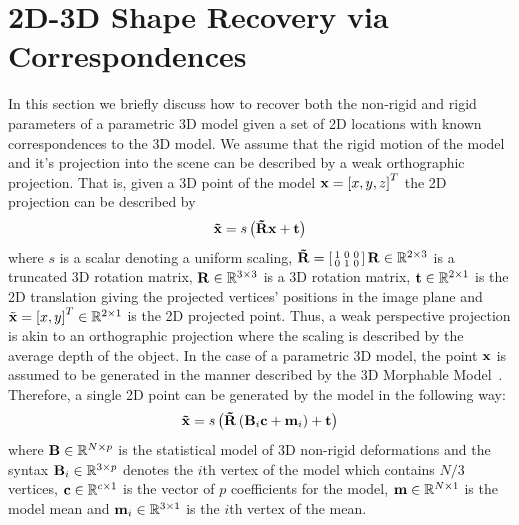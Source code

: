 \section{2D-3D Shape Recovery via Correspondences}\label{sec:face_flow_3d_recovery}
In this section we briefly discuss how to recover both the non-rigid and rigid
parameters of a parametric 3D model given a set of 2D locations with known
correspondences to the 3D model. We assume that the rigid motion of the model
and it's projection into the scene can be described by a weak orthographic
projection. That is, given a 3D point of the model $\boldsymbol{\mathbf{x}} = {[x, y, z]}^T$ the
2D projection can be described by
\begin{equation}
\boldsymbol{\mathbf{\tilde{x}}} = s \left( \boldsymbol{\mathbf{\tilde{R}}} \boldsymbol{\mathbf{x}} + \boldsymbol{\mathbf{t}} \right)
\end{equation}
where $s$ is a scalar denoting a uniform scaling,
$\boldsymbol{\mathbf{\tilde{R}}} = \left[\begin{smallmatrix} 1&0&0\\0&1&0 \end{smallmatrix}\right] \boldsymbol{\mathbf{R}} \in \mathbb{R}^{2 \times 3}$
is a truncated 3D rotation matrix, $\boldsymbol{\mathbf{R}} \in \mathbb{R}^{3 \times 3}$ is a 3D rotation matrix,
$\boldsymbol{\mathbf{t}} \in \mathbb{R}^{2 \times 1}$ is the 2D translation giving the projected vertices'
positions in the image plane and
$\tilde{\boldsymbol{\mathbf{x}}} = {[x, y]}^T \in \mathbb{R}^{2 \times 1}$ is the 2D projected point. 
Thus, a weak perspective projection is akin to an orthographic projection where the scaling
is described by the average depth of the object. In the case of a parametric 3D
model, the point $\boldsymbol{\mathbf{x}}$ is assumed to be generated in the manner described
by the 3D Morphable Model~\cite{volker1999morphable}. Therefore, a single 2D
point can be generated by the model in the following way:
\begin{equation}
\boldsymbol{\mathbf{\tilde{x}}} = s \left( \boldsymbol{\mathbf{\tilde{R}}} \left(\boldsymbol{\mathbf{B}}_i \boldsymbol{\mathbf{c}} + \boldsymbol{\mathbf{m}}_i\right) + \boldsymbol{\mathbf{t}} \right)
\end{equation}
where $\boldsymbol{\mathbf{B}} \in \mathbb{R}^{N \times p}$ is the statistical model of 3D non-rigid deformations
and the syntax $\boldsymbol{\mathbf{B}}_i \in \mathbb{R}^{3 \times p}$ denotes the $i$th vertex of the model which
contains $N / 3$ vertices,
$\boldsymbol{\mathbf{c}} \in \mathbb{R}^{c \times 1}$ is the vector of $p$ coefficients for the model,
$\boldsymbol{\mathbf{m}} \in \mathbb{R}^{N \times 1}$ is the model mean and $\boldsymbol{\mathbf{m}}_i \in \mathbb{R}^{3 \times 1}$
is the $i$th vertex of the mean.


